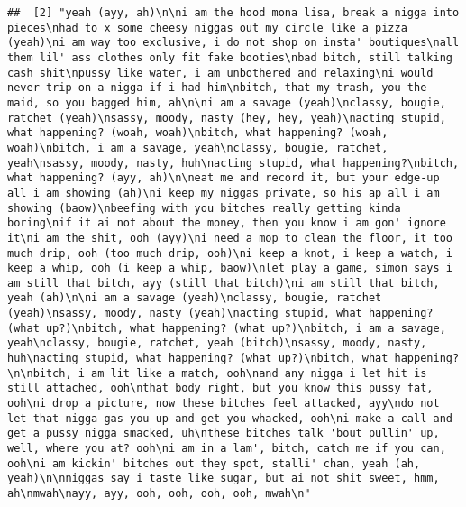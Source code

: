\documentclass[]{article}
\begin{document}
\begin{verbatim}
##  [2] "yeah (ayy, ah)\n\ni am the hood mona lisa, break a nigga into pieces\nhad to x some cheesy niggas out my circle like a pizza (yeah)\ni am way too exclusive, i do not shop on insta' boutiques\nall them lil' ass clothes only fit fake booties\nbad bitch, still talking cash shit\npussy like water, i am unbothered and relaxing\ni would never trip on a nigga if i had him\nbitch, that my trash, you the maid, so you bagged him, ah\n\ni am a savage (yeah)\nclassy, bougie, ratchet (yeah)\nsassy, moody, nasty (hey, hey, yeah)\nacting stupid, what happening? (woah, woah)\nbitch, what happening? (woah, woah)\nbitch, i am a savage, yeah\nclassy, bougie, ratchet, yeah\nsassy, moody, nasty, huh\nacting stupid, what happening?\nbitch, what happening? (ayy, ah)\n\neat me and record it, but your edge-up all i am showing (ah)\ni keep my niggas private, so his ap all i am showing (baow)\nbeefing with you bitches really getting kinda boring\nif it ai not about the money, then you know i am gon' ignore it\ni am the shit, ooh (ayy)\ni need a mop to clean the floor, it too much drip, ooh (too much drip, ooh)\ni keep a knot, i keep a watch, i keep a whip, ooh (i keep a whip, baow)\nlet play a game, simon says i am still that bitch, ayy (still that bitch)\ni am still that bitch, yeah (ah)\n\ni am a savage (yeah)\nclassy, bougie, ratchet (yeah)\nsassy, moody, nasty (yeah)\nacting stupid, what happening? (what up?)\nbitch, what happening? (what up?)\nbitch, i am a savage, yeah\nclassy, bougie, ratchet, yeah (bitch)\nsassy, moody, nasty, huh\nacting stupid, what happening? (what up?)\nbitch, what happening?\n\nbitch, i am lit like a match, ooh\nand any nigga i let hit is still attached, ooh\nthat body right, but you know this pussy fat, ooh\ni drop a picture, now these bitches feel attacked, ayy\ndo not let that nigga gas you up and get you whacked, ooh\ni make a call and get a pussy nigga smacked, uh\nthese bitches talk 'bout pullin' up, well, where you at? ooh\ni am in a lam', bitch, catch me if you can, ooh\ni am kickin' bitches out they spot, stalli' chan, yeah (ah, yeah)\n\nniggas say i taste like sugar, but ai not shit sweet, hmm, ah\nmwah\nayy, ayy, ooh, ooh, ooh, ooh, mwah\n"                                                                                                                                                                                                                                                                                                                                                                                                                                                                                                                                                                                                                                                                                                                                                                                                                                                                                                                                                                                                                                                                                                                                                              
\end{verbatim}
\end{document}
